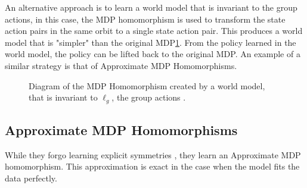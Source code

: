An alternative approach is to learn a world model that is invariant to the group actions, in this case, the MDP homomorphism is used to transform the state action pairs in the same orbit to a single state action pair. This produces a world model that is "simpler" than the original MDP\ref{fig:invariant_world_model}. From the policy learned in the world model, the policy can be lifted back to the original MDP. An example of a similar strategy is that of Approximate MDP Homomorphisms.
\begin{figure}[h]
	\centering
	\caption{Diagram of the MDP Homomorphism created by a world model, that is invariant to $\ell_g$,  the group actions .}
	\label{fig:invariant_world_model}
\end{figure}
\subsection{Approximate MDP Homomorphisms}
While they forgo learning explicit symmetries \cite{van2020plannable}, they learn an Approximate MDP homomorphism. This approximation is exact in the case when the model fits the data perfectly.


